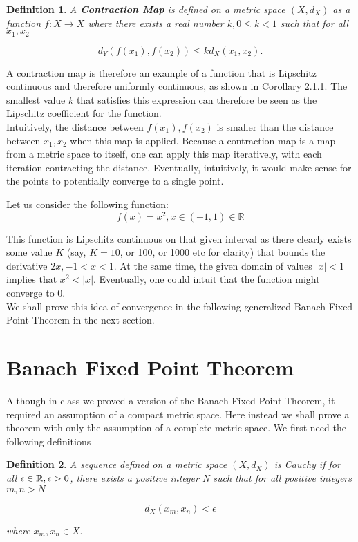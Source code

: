 \documentclass{article}
\newtheorem{definition}{Definition}
\theoremstyle{remark}
\begin{document}
\begin{definition}A \textbf{Contraction Map} is defined on a metric space $(X, d_X)$ as a function $f: X \to X$ where there exists a real number $k, 0\leq k<1$ such that for all $x_1, x_2$

$$d_Y(f(x_1),f(x_2)) \leq kd_X(x_1,x_2).$$

\end{definition}

A contraction map is therefore an example of a function that is Lipschitz continuous and therefore uniformly continuous, as shown in Corollary 2.1.1. The smallest value $k$ that satisfies this expression can therefore be seen as the Lipschitz coefficient for the function. \\

Intuitively, the distance between $f(x_1), f(x_2)$ is smaller than the distance between $x_1, x_2$ when this map is applied. Because a contraction map is a map from a metric space to itself, one can apply this map iteratively, with each iteration contracting the distance. Eventually, intuitively, it would make sense for the points to potentially converge to a single point. 

Let us consider the following function:
$$f(x) = x^2, x \in (-1,1) \in \mathbb{R}$$

This function is Lipschitz continuous on that given interval as there clearly exists some value $K$ (say, $K=10$, or 100, or 1000 etc for clarity) that bounds the derivative $2x, -1<x<1$. At the same time, the given domain of values $|x| < 1$ implies that $x^2 < |x|$. Eventually, one could intuit that the function might converge to 0. \\

We shall prove this idea of convergence in the following generalized Banach Fixed Point Theorem in the next section.\\ 

\section{Banach Fixed Point Theorem}

Although in class we proved a version of the Banach Fixed Point Theorem, it required an assumption of a compact metric space. Here instead we shall prove a theorem with only the assumption of a complete metric space. We first need the following definitions\\

\begin{definition} A sequence defined on a metric space $(X, d_X)$ is Cauchy if for all $\epsilon \in \Bbb R, \epsilon > 0$, there exists a positive integer N such that for all positive integers $m, n >N $ 

$$d_X(x_m, x_n) < \epsilon$$

where $x_m, x_n \in X.$
\end{definition}
\end{document}
